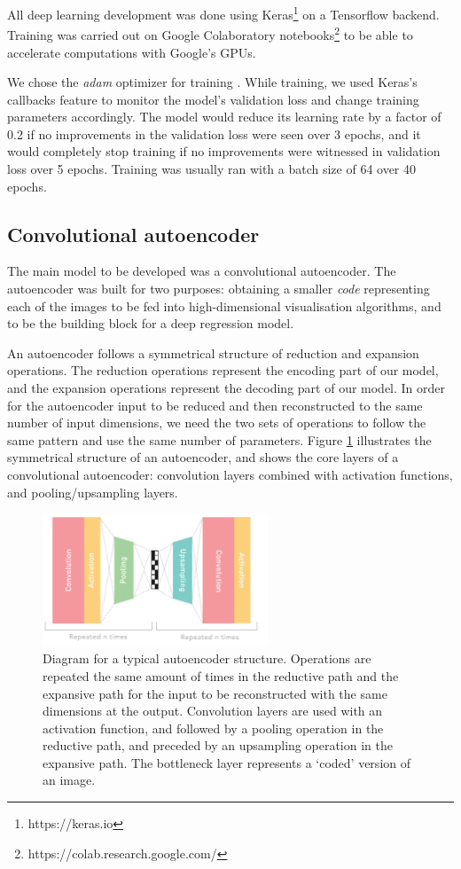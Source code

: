 All deep learning development was done using Keras\footnote{https://keras.io} on a Tensorflow backend. Training was carried out on Google Colaboratory notebooks\footnote{https://colab.research.google.com/} to be able to accelerate computations with Google's GPUs.

We chose the \textit{adam} optimizer for training \citep{kingma2014method}. While training, we used Keras's callbacks feature to monitor the model's validation loss and change training parameters accordingly. The model would reduce its learning rate by a factor of 0.2 if no improvements in the validation loss were seen over 3 epochs, and it would completely stop training if no improvements were witnessed in validation loss over 5 epochs. Training was usually ran with a batch size of 64 over 40 epochs.

\subsection{Convolutional autoencoder}

The main model to be developed was a convolutional autoencoder. The autoencoder was built for two purposes: obtaining a smaller \textit{code} representing each of the images to be fed into high-dimensional visualisation algorithms, and to be the building block for a deep regression model.

An autoencoder follows a symmetrical structure of reduction and expansion operations. The reduction operations represent the encoding part of our model, and the expansion operations represent the decoding part of our model. In order for the autoencoder input to be reduced and then reconstructed to the same number of input dimensions, we need the two sets of operations to follow the same pattern and use the same number of parameters. Figure \ref{fig:symmstruc} illustrates the symmetrical structure of an autoencoder, and shows the core layers of a convolutional autoencoder: convolution layers combined with activation functions, and pooling/upsampling layers.

\begin{figure}[h!]
    \centering
    \includegraphics[width=0.6\textwidth]{dissertation/figures/autoencoder_repeat_structure.png}
    \caption{Diagram for a typical autoencoder structure. Operations are repeated the same amount of times in the reductive path and the expansive path for the input to be reconstructed with the same dimensions at the output. Convolution layers are used with an activation function, and followed by a pooling operation in the reductive path, and preceded by an upsampling operation in the expansive path. The bottleneck layer represents a `coded' version of an image.}
    \label{fig:symmstruc}
\end{figure}

